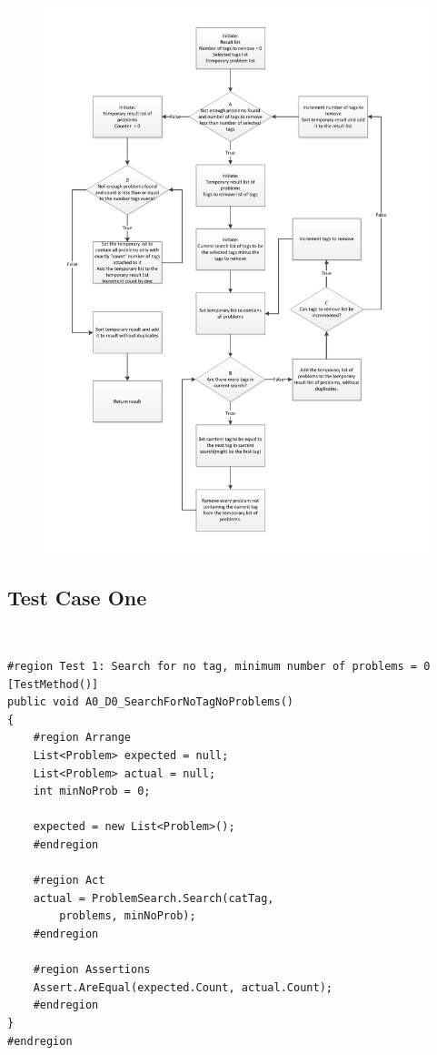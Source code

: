 \label{sec:unit_problem_search}
\begin{figure}[p]
	\centering
		\includegraphics[width=1.25\textwidth]{input/testing/problem_search.pdf}
	\label{fig:problem_search_flow}
\end{figure}


\subsection{Test Case One}\
\begin{lstlisting}[style=sourceCode, caption=\myCaption{The test case for no run of any loops}, label=src:noLoops,float=htb]
#region Test 1: Search for no tag, minimum number of problems = 0
[TestMethod()]
public void A0_D0_SearchForNoTagNoProblems()
{
	#region Arrange
	List<Problem> expected = null;
	List<Problem> actual = null;
	int minNoProb = 0;

	expected = new List<Problem>();
	#endregion

	#region Act
	actual = ProblemSearch.Search(catTag,
		problems, minNoProb);
	#endregion

	#region Assertions
	Assert.AreEqual(expected.Count, actual.Count);
	#endregion
}
#endregion
\end{lstlisting}

